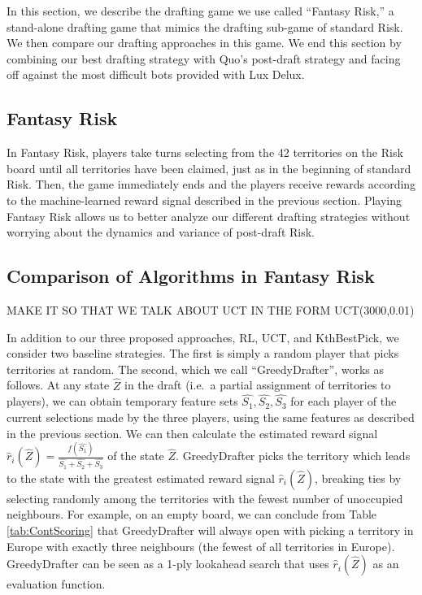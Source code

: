 \documentclass[letterpaper]{article}
\numberwithin{equation}{section}
\numberwithin{theorem}{section}
\numberwithin{lemma}{section}
\numberwithin{df}{section}
\begin{document}
In this section, we describe the drafting game we use called ``Fantasy Risk,'' a stand-alone drafting game that mimics the drafting sub-game of standard Risk.  We then compare our drafting approaches in this game.  We end this section by combining our best drafting strategy with Quo's post-draft strategy and facing off against the most difficult bots provided with Lux Delux.

\subsection{Fantasy Risk}

In Fantasy Risk, players take turns selecting from the 42 territories on the Risk board until all territories have been claimed, just as in the beginning of standard Risk.  Then, the game immediately ends and the players receive rewards according to the machine-learned reward signal described in the previous section.  Playing Fantasy Risk allows us to better analyze our different drafting strategies without worrying about the dynamics and variance of post-draft Risk.  

\subsection{Comparison of Algorithms in Fantasy Risk}

MAKE IT SO THAT WE TALK ABOUT UCT IN THE FORM UCT(3000,0.01)

In addition to our three proposed approaches, RL, UCT, and KthBestPick, we consider two baseline strategies.  The first is simply a random player that picks territories at random.  The second, which we call ``GreedyDrafter'', works as follows.  At any state $\hat{Z}$ in the draft (i.e.~a partial assignment of territories to players), we can obtain temporary feature sets $\hat{S_1}, \hat{S_2}, \hat{S_3}$ for each player of the current selections made by the three players, using the same features as described in the previous section.  We can then calculate the estimated reward signal $\hat{r}_i(\hat{Z}) = \frac{f(\hat{S_1})}{\hat{S_1} + \hat{S_2} + \hat{S_3}}$ of the state $\hat{Z}$.  GreedyDrafter picks the territory which leads to the state with the greatest estimated reward signal $\hat{r}_i(\hat{Z})$, breaking ties by selecting randomly among the territories with the fewest number of unoccupied neighbours.  For example, on an empty board, we can conclude from Table \ref{tab:ContScoring} that GreedyDrafter will always open with picking a territory in Europe with exactly three neighbours (the fewest of all territories in Europe).  GreedyDrafter can be seen as a 1-ply lookahead search that uses $\hat{r}_i(\hat{Z})$ as an evaluation function.
\end{document}
